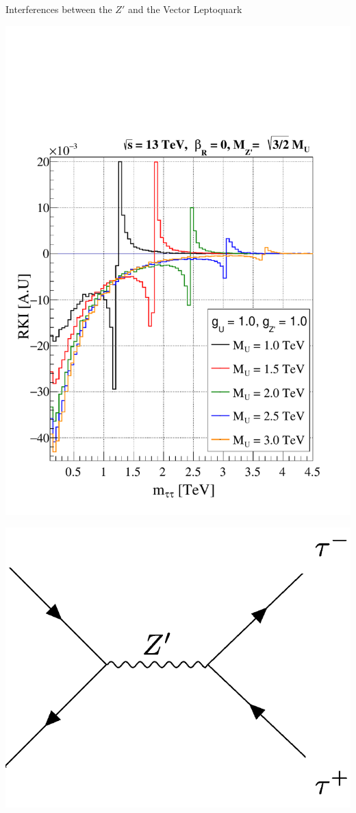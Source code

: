 \documentclass{bredelebeamer}
\begin{document}
\begin{frame}{Interferences between the $Z'$ and the Vector Leptoquark}

	\begin{minipage}{.50\linewidth}
		\includegraphics[width=\linewidth]{Kinematic_Interference_gu_1.0_gzp_1.0_zp_upper_limit_woRHC.pdf}
	\end{minipage}
	\begin{minipage}{.48\linewidth}
		\begin{center}
			\includegraphics[width=\linewidth]{Zp.png}
		\end{center}


\end{minipage}
\end{frame}
\end{document}
